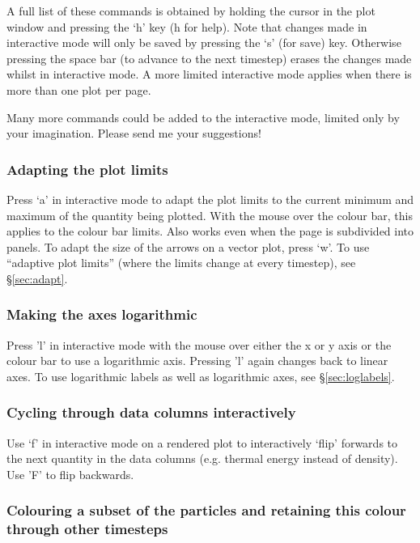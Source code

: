 \documentclass[a4paper,10pt]{article}
\begin{document}
 A full list of these commands is obtained by holding
the cursor in the plot window and pressing the `h' key (h for help). Note that changes made in interactive mode will only be saved by pressing the
`s' (for save) key. Otherwise pressing the space bar (to advance to the next
timestep) erases the changes made whilst in interactive mode. A more limited
interactive mode applies when there is more than one plot per page.

 Many more commands could be added to
the interactive mode, limited only by your imagination. Please send me your suggestions!

\subsubsection{ Adapting the plot limits}
 Press `a' in interactive mode to adapt the plot limits to the current minimum and maximum of the quantity being plotted. With the mouse over the colour bar, this applies to the colour bar limits. Also works even when the page is subdivided into panels. To adapt the size of the arrows on a vector plot, press `w'. To use ``adaptive plot limits'' (where the limits change at every timestep), see \S\ref{sec:adapt}.

\subsubsection{ Making the axes logarithmic}
 Press 'l' in interactive mode with the mouse over either the x or y axis or the colour bar to use a logarithmic axis. Pressing 'l' again changes back to linear axes. To use logarithmic labels as well as logarithmic axes, see \S\ref{sec:loglabels}.

\subsubsection{Cycling through data columns interactively}
 Use `f' in interactive mode on a rendered plot to interactively `flip' forwards to the next quantity in the data columns (e.g. thermal energy instead of density). Use 'F' to flip backwards.

\subsubsection{ Colouring a subset of the particles and retaining this colour through other timesteps}
\label{sec:colourparts}
\end{document}
